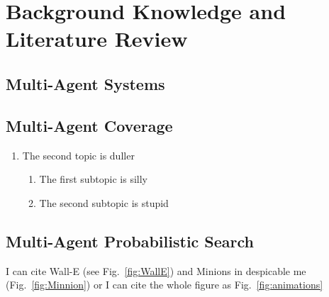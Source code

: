 
\chapter{Background Knowledge and Literature Review}

\ifpdf
    \graphicspath{{Chapter2/Figs/Raster/}{Chapter2/Figs/PDF/}{Chapter2/Figs/}}
\else
    \graphicspath{{Chapter2/Figs/Vector/}{Chapter2/Figs/}}
\fi


\section[Short title]{Multi-Agent Systems}


\section{Multi-Agent Coverage}

\begin{enumerate}

\item The second topic is duller
\begin{enumerate}
\item The first subtopic is silly
\item The second subtopic is stupid
\end{enumerate}
\end{enumerate}

\section{Multi-Agent Probabilistic Search}

\begin{landscape}

I can cite Wall-E (see Fig.~\ref{fig:WallE}) and Minions in despicable me (Fig.~\ref{fig:Minnion}) or I can cite the whole figure as Fig.~\ref{fig:animations}



\end{landscape}
